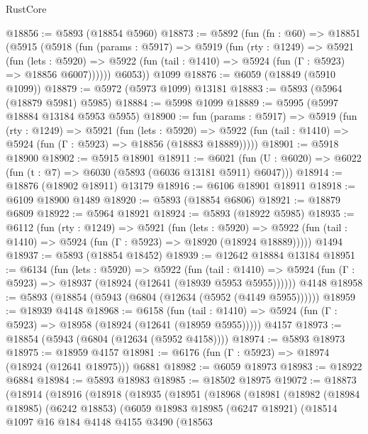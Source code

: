 \begin{lexlean}{RustCore}
\begin{coremodule}
@18856 := @5893 (@18854 @5960)
@18873 := @5892
    (fun (fn : @60) =>
    @18851
      (@5915
        (@5918
          (fun (params : @5917) =>
          @5919
            (fun (rty : @1249) =>
            @5921
              (fun (lets : @5920) =>
              @5922 (fun (tail : @1410) => @5924 (fun (Γ : @5923) => @18856 @6007))))))
        @6053))
    @1099
@18876 := @6059 (@18849 (@5910 @1099))
@18879 := @5972 (@5973 @1099) @13181
@18883 := @5893 (@5964 (@18879 @5981) @5985)
@18884 := @5998 @1099
@18889 := @5995 (@5997 @18884 @13184 @5953 @5955)
@18900 := fun (params : @5917) =>
  @5919
    (fun (rty : @1249) =>
    @5921
      (fun (lets : @5920) =>
      @5922 (fun (tail : @1410) => @5924 (fun (Γ : @5923) => @18856 (@18883 @18889)))))
@18901 := @5918 @18900
@18902 := @5915 @18901
@18911 := @6021
    (fun (U : @6020) => @6022 (fun (t : @7) => @6030 (@5893 (@6036 @13181 @5911) @6047)))
@18914 := @18876 (@18902 @18911) @13179
@18916 := @6106 @18901 @18911
@18918 := @6109 @18900 @1489
@18920 := @5893 (@18854 @6806)
@18921 := @18879 @6809
@18922 := @5964 @18921
@18924 := @5893 (@18922 @5985)
@18935 := @6112
    (fun (rty : @1249) =>
    @5921
      (fun (lets : @5920) =>
      @5922 (fun (tail : @1410) => @5924 (fun (Γ : @5923) => @18920 (@18924 @18889)))))
    @1494
@18937 := @5893 (@18854 @18452)
@18939 := @12642 @18884 @13184
@18951 := @6134
    (fun (lets : @5920) =>
    @5922
      (fun (tail : @1410) =>
      @5924 (fun (Γ : @5923) => @18937 (@18924 (@12641 (@18939 @5953 @5955))))))
    @4148
@18958 := @5893 (@18854 (@5943 (@6804 (@12634 (@5952 (@4149 @5955))))))
@18959 := @18939 @4148
@18968 := @6158
    (fun (tail : @1410) => @5924 (fun (Γ : @5923) => @18958 (@18924 (@12641 (@18959 @5955)))))
    @4157
@18973 := @18854 (@5943 (@6804 (@12634 (@5952 @4158))))
@18974 := @5893 @18973
@18975 := @18959 @4157
@18981 := @6176 (fun (Γ : @5923) => @18974 (@18924 (@12641 @18975))) @6881
@18982 := @6059 @18973
@18983 := @18922 @6884
@18984 := @5893 @18983
@18985 := @18502 @18975
@19072 := @18873
    (@18914
      (@18916
        (@18918
          (@18935
            (@18951
              (@18968
                (@18981
                  (@18982
                    (@18984 @18985)
                    (@6242 @18853)
                    (@6059
                      @18983
                      @18985
                      (@6247 @18921)
                      (@18514
                        @1097
                        @16
                        @184
                        @4148
                        @4155
                        @3490
                        (@18563

\end{coremodule}
\end{lexlean}
